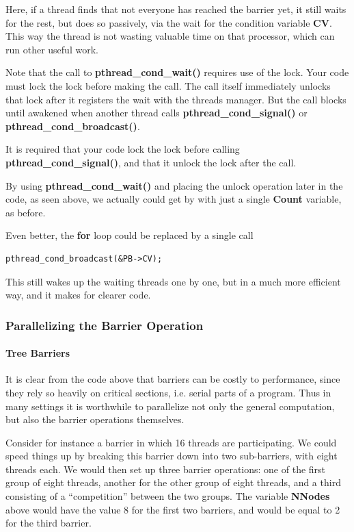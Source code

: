 Here, if a thread finds that not everyone has reached the barrier
yet, it still waits for the rest, but does so passively, via the
wait for the condition variable {\bf CV}.  This way the thread is not
wasting valuable time on that processor, which can run other useful
work.

Note that the call to {\bf pthread\_cond\_wait()} requires use of the
lock.  Your code must lock the lock before making the call.  The call
itself immediately unlocks that lock after it registers the wait with
the threads manager.  But the call blocks until awakened when another
thread calls {\bf pthread\_cond\_signal()} or {\bf
pthread\_cond\_broadcast()}.

It is required that your code lock the lock before calling {\bf
pthread\_cond\_signal()}, and that it unlock the lock after the call.

By using {\bf pthread\_cond\_wait()} and placing the unlock operation
later in the code, as seen above, we actually could get by with just a
single {\bf Count} variable, as before.

Even better, the {\bf for} loop could be replaced by a single call

\begin{Verbatim}[fontsize=\relsize{-2}]
pthread_cond_broadcast(&PB->CV);
\end{Verbatim}

This still wakes up the waiting threads one by one, but in a much more
efficient way, and it makes for clearer code.

\subsubsection{Parallelizing the Barrier Operation}

\paragraph{Tree Barriers}

It is clear from the code above that barriers can be costly to
performance, since they rely so heavily on critical sections, i.e.
serial parts of a program.  Thus in many settings it is worthwhile to
parallelize not only the general computation, but also the barrier
operations themselves.

Consider for instance a barrier in which 16 threads are participating.
We could speed things up by breaking this barrier down into two
sub-barriers, with eight threads each.  We would then set up three
barrier operations:  one of the first group of eight threads, another
for the other group of eight threads, and a third consisting of a
``competition'' between the two groups.   The variable
{\bf NNodes} above would have the value 8 for the first two barriers,
and would be equal to 2 for the third barrier.  

